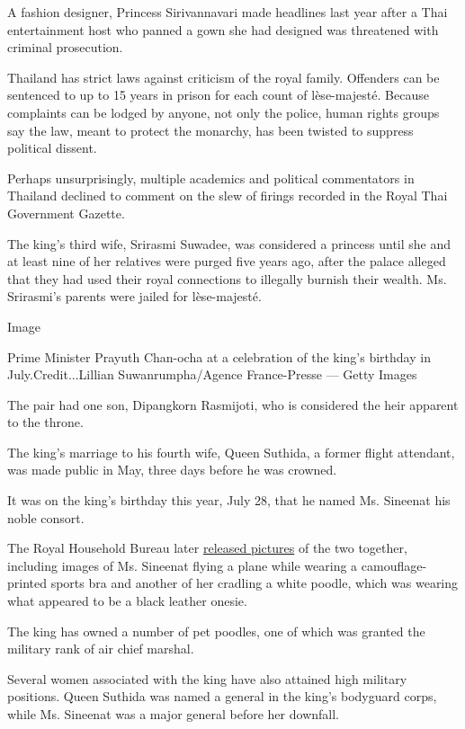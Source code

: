 A fashion designer, Princess Sirivannavari made headlines last year
after a Thai entertainment host who panned a gown she had designed was
threatened with criminal prosecution.

Thailand has strict laws against criticism of the royal family.
Offenders can be sentenced to up to 15 years in prison for each count of
lèse-majesté. Because complaints can be lodged by anyone, not only the
police, human rights groups say the law, meant to protect the monarchy,
has been twisted to suppress political dissent.

Perhaps unsurprisingly, multiple academics and political commentators in
Thailand declined to comment on the slew of firings recorded in the
Royal Thai Government Gazette.

The king's third wife, Srirasmi Suwadee, was considered a princess until
she and at least nine of her relatives were purged five years ago, after
the palace alleged that they had used their royal connections to
illegally burnish their wealth. Ms. Srirasmi's parents were jailed for
lèse-majesté.

Image

Prime Minister Prayuth Chan-ocha at a celebration of the king's birthday
in July.Credit...Lillian Suwanrumpha/Agence France-Presse --- Getty
Images

The pair had one son, Dipangkorn Rasmijoti, who is considered the heir
apparent to the throne.

The king's marriage to his fourth wife, Queen Suthida, a former flight
attendant, was made public in May, three days before he was crowned.

It was on the king's birthday this year, July 28, that he named Ms.
Sineenat his noble consort.

The Royal Household Bureau later
\href{https://www.nytimes3xbfgragh.onion/2019/08/27/world/asia/thailand-consort-king.html}{released
pictures} of the two together, including images of Ms. Sineenat flying a
plane while wearing a camouflage-printed sports bra and another of her
cradling a white poodle, which was wearing what appeared to be a black
leather onesie.

The king has owned a number of pet poodles, one of which was granted the
military rank of air chief marshal.

Several women associated with the king have also attained high military
positions. Queen Suthida was named a general in the king's bodyguard
corps, while Ms. Sineenat was a major general before her downfall.

